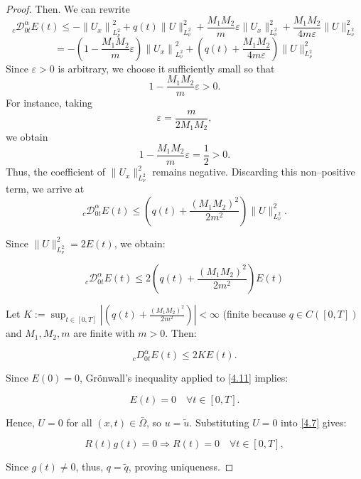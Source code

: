 \documentclass[reqno]{amsart}
\theoremstyle{definition}
\numberwithin{equation}{section}
\begin{document}
\begin{proof}
Then. We can rewrite 
\begin{equation*}
    {_c}\mathcal{D}_{0t}^{\alpha} E(t)  \leq -\left\|U_x\right\|_{L_{\nu}^2}^2+q(t)\|U\|_{L_{\nu}^2}^2+\frac{M_1M_2}{m}\varepsilon\|U_x\|_{L_{\nu}^2}^2+\frac{M_1M_2}{4m\varepsilon}\|U\|_{L_{\nu}^2}^2
\end{equation*}
\begin{equation*}
    =-\left(1-\frac{M_1M_2}{m}\varepsilon\right)\left\|U_x\right\|_{L_{\nu}^2}^2+\left(q(t)+\frac{M_1M_2}{4m\varepsilon}\right)\|U\|_{L_{\nu}^2}^2
\end{equation*}
Since $\varepsilon>0$ is arbitrary, we choose it sufficiently small so that
\begin{equation*}
    1-\frac{M_1M_2}{m}\varepsilon>0.
\end{equation*}
For instance, taking
\begin{equation*}
    \varepsilon=\frac{m}{2M_1M_2},
\end{equation*}
we obtain
\begin{equation*}
    1-\frac{M_1M_2}{m}\varepsilon
=
\frac12>0.
\end{equation*}
Thus, the coefficient of $\|U_x\|_{L_{\nu}^2}^2$ remains negative. 
Discarding this non–positive term, we arrive at
\begin{equation*}
    {_c}\mathcal{D}_{0t}^{\alpha}E(t)
\le
\left(q(t)+\frac{(M_1M_2)^2}{2m^2}\right)\|U\|_{L_{\nu}^2}^2.
\end{equation*}

Since $\|U\|_{L_{\nu}^2}^2=2 E(t)$, we obtain:

\begin{equation*}
     {_c}\mathcal{D}_{0t}^{\alpha} E(t) \leq 2\left(q(t)+\frac{(M_1M_2)^2}{2m^2}\right) E(t)
\end{equation*}


Let $K:=\sup _{t \in[0, T]}\left|\left(q(t)+\frac{(M_1M_2)^2}{2m^2}\right)\right|<\infty$ (finite because $q \in C([0, T])$ and $M_1, M_2, m$ are finite with $m>0$. Then:

\begin{equation}\label{4.11}
    {_c}D_{0t}^{\alpha}E(t) \leq 2 K E(t) .
\end{equation}

Since $E(0)=0$, Grönwall's inequality applied to \eqref{4.11} implies:

\begin{equation*}
    E(t)=0 \quad \forall t \in[0, T] .
\end{equation*}


Hence, $U=0$ for all $(x, t) \in \bar{\Omega}$, so $u=\tilde{u}$. Substituting $U=0$ into \eqref{4.7} gives:

\begin{equation*}
    R(t) g(t)=0 \Longrightarrow R(t)=0 \quad \forall t \in[0, T],
\end{equation*}


Since $g(t) \neq 0$, thus, $q=\tilde{q}$, proving uniqueness.
\end{proof}
\end{document}
